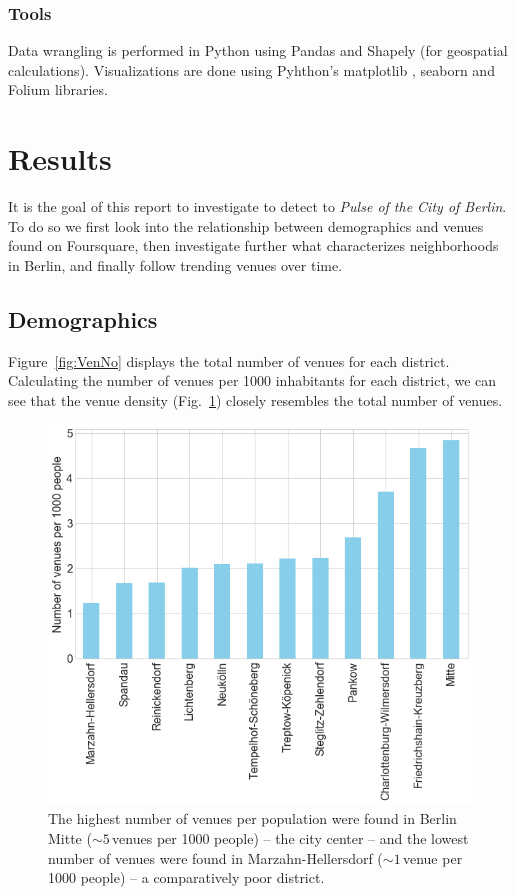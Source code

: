 \documentclass[letter]{scrartcl}
\begin{document}
\subsubsection{Tools}
Data wrangling is performed in Python using Pandas \cite{pd} and Shapely \cite{shapely} (for geospatial calculations).
Visualizations are done using Pyhthon's matplotlib \cite{matplotlib}, seaborn \cite{sns} and Folium \cite{Folium} libraries. 
 
\section{Results}

It is the goal of this report to investigate to detect to \emph{Pulse of the City of Berlin}. To do so we first look into the relationship between demographics and venues found on Foursquare, then investigate further what characterizes neighborhoods in Berlin, and finally follow trending venues over time.

\subsection{Demographics}
Figure~\ref{fig:VenNo} displays the total number of venues for each district. 
Calculating the number of venues per 1000 inhabitants for each district, we can see that the venue density  (Fig.~\ref{fig:VenDens}) closely resembles the total number of venues.  

\begin{figure}[h!]
\centering
\includegraphics[width=12cm]{../Figures/VenueDensity.PNG}
\caption{The highest number of venues per population were found in Berlin Mitte ($\sim 5$\,venues per 1000 people) -- the city center --  and the lowest number of venues were found in Marzahn-Hellersdorf ($\sim 1$\,venue per 1000 people) -- a comparatively poor district.}\label{fig:VenDens}
\end{figure}
\end{document}
